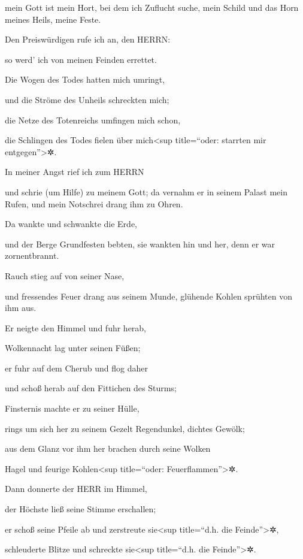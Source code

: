 mein Gott ist mein Hort, bei dem ich Zuflucht suche, mein Schild und das
Horn meines Heils, meine Feste.

Den Preiswürdigen rufe ich an, den HERRN:

so werd' ich von meinen Feinden errettet.

Die Wogen des Todes hatten mich umringt,

und die Ströme des Unheils schreckten mich;

die Netze des Totenreichs umfingen mich schon,

die Schlingen des Todes fielen über mich\textless sup title=``oder:
starrten mir entgegen''\textgreater✲.

In meiner Angst rief ich zum HERRN

und schrie (um Hilfe) zu meinem Gott; da vernahm er in seinem Palast
mein Rufen, und mein Notschrei drang ihm zu Ohren.

Da wankte und schwankte die Erde,

und der Berge Grundfesten bebten, sie wankten hin und her, denn er war
zornentbrannt.

Rauch stieg auf von seiner Nase,

und fressendes Feuer drang aus seinem Munde, glühende Kohlen sprühten
von ihm aus.

Er neigte den Himmel und fuhr herab,

Wolkennacht lag unter seinen Füßen;

er fuhr auf dem Cherub und flog daher

und schoß herab auf den Fittichen des Sturms;

Finsternis machte er zu seiner Hülle,

rings um sich her zu seinem Gezelt Regendunkel, dichtes Gewölk;

aus dem Glanz vor ihm her brachen durch seine Wolken

Hagel und feurige Kohlen\textless sup title=``oder:
Feuerflammen''\textgreater✲.

Dann donnerte der HERR im Himmel,

der Höchste ließ seine Stimme erschallen;

er schoß seine Pfeile ab und zerstreute sie\textless sup
title=``d.h. die Feinde''\textgreater✲,

schleuderte Blitze und schreckte sie\textless sup title=``d.h. die
Feinde''\textgreater✲.

